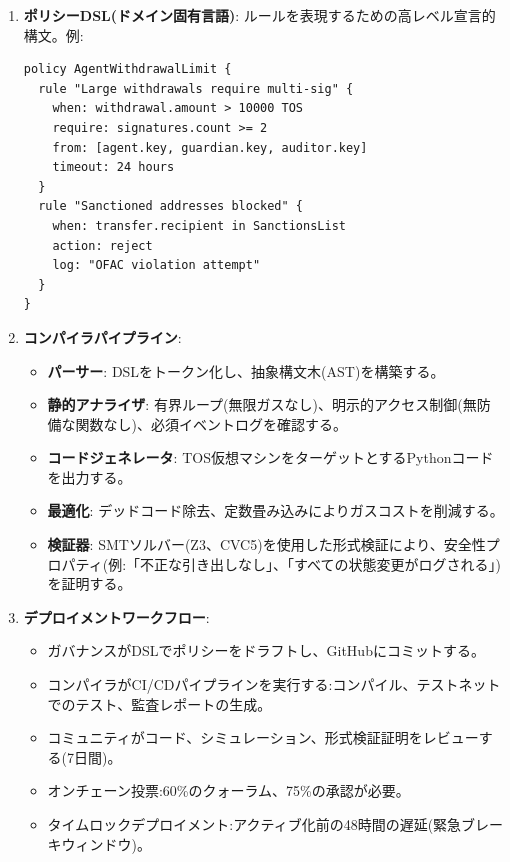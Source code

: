 \documentclass[11pt]{article}
\begin{document}
\begin{enumerate}[noitemsep]
  \item \textbf{ポリシーDSL(ドメイン固有言語)}: ルールを表現するための高レベル宣言的構文。例:
  \begin{verbatim}
policy AgentWithdrawalLimit {
  rule "Large withdrawals require multi-sig" {
    when: withdrawal.amount > 10000 TOS
    require: signatures.count >= 2
    from: [agent.key, guardian.key, auditor.key]
    timeout: 24 hours
  }
  rule "Sanctioned addresses blocked" {
    when: transfer.recipient in SanctionsList
    action: reject
    log: "OFAC violation attempt"
  }
}
  \end{verbatim}
  \item \textbf{コンパイラパイプライン}:
    \begin{itemize}[noitemsep]
      \item \textbf{パーサー}: DSLをトークン化し、抽象構文木(AST)を構築する。
      \item \textbf{静的アナライザ}: 有界ループ(無限ガスなし)、明示的アクセス制御(無防備な関数なし)、必須イベントログを確認する。
      \item \textbf{コードジェネレータ}: TOS仮想マシンをターゲットとするPythonコードを出力する。
      \item \textbf{最適化}: デッドコード除去、定数畳み込みによりガスコストを削減する。
      \item \textbf{検証器}: SMTソルバー(Z3、CVC5)を使用した形式検証により、安全性プロパティ(例:「不正な引き出しなし」、「すべての状態変更がログされる」)を証明する。
    \end{itemize}
  \item \textbf{デプロイメントワークフロー}:
    \begin{itemize}[noitemsep]
      \item ガバナンスがDSLでポリシーをドラフトし、GitHubにコミットする。
      \item コンパイラがCI/CDパイプラインを実行する:コンパイル、テストネットでのテスト、監査レポートの生成。
      \item コミュニティがコード、シミュレーション、形式検証証明をレビューする(7日間)。
      \item オンチェーン投票:60\%のクォーラム、75\%の承認が必要。
      \item タイムロックデプロイメント:アクティブ化前の48時間の遅延(緊急ブレーキウィンドウ)。
    \end{itemize}
\end{enumerate}
\end{document}
